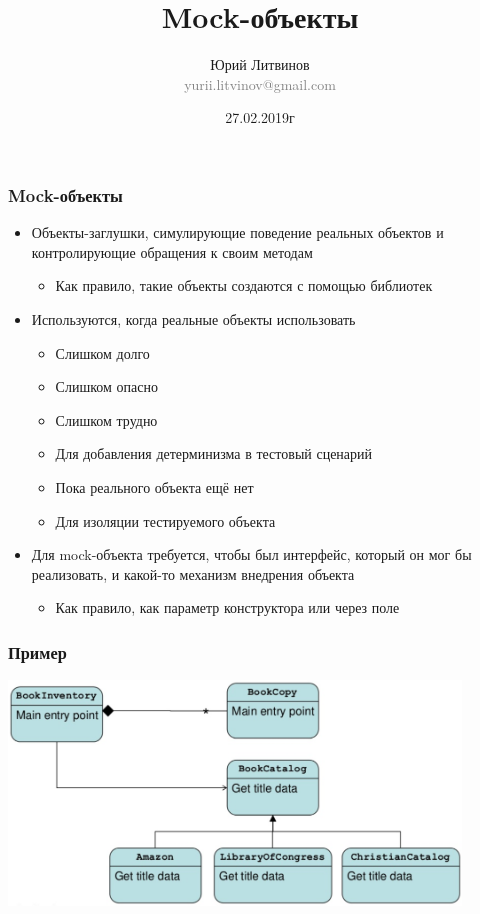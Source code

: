 \documentclass[xetex,mathserif,serif]{beamer}
\title{Mock-объекты}
\author[Юрий Литвинов]{Юрий Литвинов\\\small{\textcolor{gray}{yurii.litvinov@gmail.com}}}
\date{27.02.2019г}
\begin{document}
	\frame{\titlepage}

	\begin{frame}
		\frametitle{Mock-объекты}
		\begin{itemize}
			\item Объекты-заглушки, симулирующие поведение реальных объектов и контролирующие обращения к своим методам
			\begin{itemize}
				\item Как правило, такие объекты создаются с помощью библиотек
			\end{itemize}
			\item Используются, когда реальные объекты использовать
			\begin{itemize}
				\item Слишком долго
				\item Слишком опасно
				\item Слишком трудно
				\item Для добавления детерминизма в тестовый сценарий
				\item Пока реального объекта ещё нет
				\item Для изоляции тестируемого объекта
			\end{itemize}
			\item Для mock-объекта требуется, чтобы был интерфейс, который он мог бы реализовать, и какой-то механизм внедрения объекта
			\begin{itemize}
				\item Как правило, как параметр конструктора или через поле
			\end{itemize}
		\end{itemize}
	\end{frame}

	\begin{frame}
		\frametitle{Пример}
		\begin{center}
			\includegraphics[width=0.9\textwidth]{classesHierarchy.png}
		\end{center}
	\end{frame}
\end{document}
